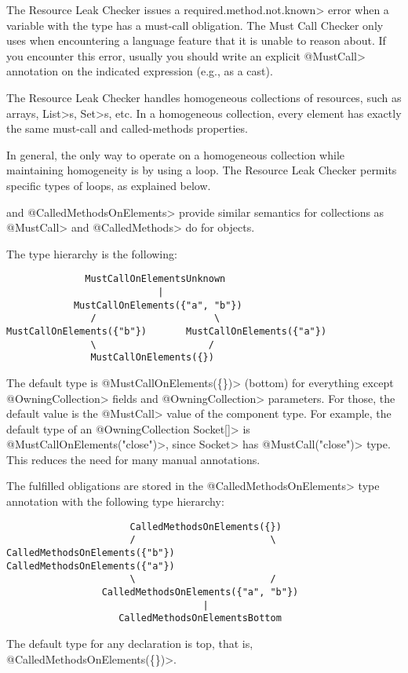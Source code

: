 The Resource Leak Checker issues a \<required.method.not.known> error
when a variable with the type \MustCallUnknown has a must-call obligation.
The Must Call Checker
only uses \MustCallUnknown when encountering a language
feature that it is unable to reason about.
If you encounter this error, usually you should write an explicit \<@MustCall> annotation
on the indicated expression (e.g., as a cast).



The Resource Leak Checker handles homogeneous collections of resources,
such as arrays, \<List>s, \<Set>s, etc.  In a homogeneous collection, every element
has exactly the same must-call and called-methods properties.

In general,
the only way to operate on a homogeneous collection while maintaining
homogeneity is by using a loop.  The Resource Leak Checker permits
specific types of loops, as explained below.


\MustCallOnElements and \<@CalledMethodsOnElements> provide similar semantics for collections as \<@MustCall> and \<@CalledMethods> do for objects.

The type hierarchy is the following:

\begin{verbatim}
              MustCallOnElementsUnknown
                           |
            MustCallOnElements({"a", "b"})
               /                     \
MustCallOnElements({"b"})       MustCallOnElements({"a"})
               \                    /
               MustCallOnElements({})
\end{verbatim}

The default type is \<@MustCallOnElements(\{\})> (bottom) for everything except
\<@OwningCollection> fields and \<@OwningCollection> parameters. For those, the
default \MustCallOnElements value is the \<@MustCall> value of the component
type. For example, the default type of an \<@OwningCollection Socket[]> is
\<@MustCallOnElements({"close"})>, since \<Socket> has \<@MustCall("close")>
type. This reduces the need for many manual annotations.

The fulfilled obligations are stored in the \<@CalledMethodsOnElements> type annotation with the following type hierarchy:
\begin{verbatim}
                      CalledMethodsOnElements({})
                      /                        \
CalledMethodsOnElements({"b"})           CalledMethodsOnElements({"a"})
                      \                        /
                 CalledMethodsOnElements({"a", "b"})
                                   |
                    CalledMethodsOnElementsBottom
\end{verbatim}
The default type for any declaration is top, that is, \<@CalledMethodsOnElements(\{\})>.



